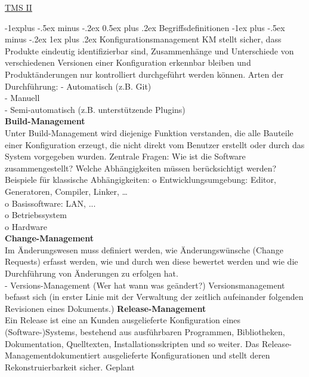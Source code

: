 \documentclass[5pt]{article}
\makeatletter
\renewcommand{\subsection}{\@startsection{subsection}{2}{0mm}%
                                {-1explus -.5ex minus -.2ex}%
                                {0.5ex plus .2ex}%
                                {\normalfont\normalsize\bfseries}}
\renewcommand{\subsubsection}{\@startsection{subsubsection}{3}{0mm}%
                                {-1ex plus -.5ex minus -.2ex}%
                                {1ex plus .2ex}%
                                {\normalfont\small\bfseries}}
\makeatother
\begin{document}
\raggedcolumns
\raggedright
\footnotesize
\begin{multicols*}{2}


\setlength{\premulticols}{1pt}
\setlength{\postmulticols}{1pt}
\setlength{\multicolsep}{1pt}
\setlength{\columnsep}{2pt}

\begin{center}
     \Large{\underline{TMS II}} \\
 
\end{center}


\subsection{Begriffsdefinitionen}
\subsubsection{Konfigurationsmanagement}
KM stellt sicher, dass Produkte eindeutig identifizierbar sind, Zusammenhänge und Unterschiede von
verschiedenen Versionen einer Konfiguration erkennbar bleiben und Produktänderungen nur kontrolliert durchgeführt werden können.
Arten der Durchführung:
- Automatisch (z.B. Git)\\
- Manuell\\
- Semi-automatisch (z.B. unterstützende Plugins)\\
\textbf{Build-Management}\\
Unter Build-Management wird diejenige Funktion verstanden, die alle Bauteile einer Konfiguration
erzeugt, die nicht direkt vom Benutzer erstellt oder durch das System vorgegeben wurden. Zentrale Fragen: Wie ist die Software zusammengestellt? Welche Abhängigkeiten müssen berücksichtigt werden? Beispiele für klassische Abhängigkeiten:
o Entwicklungsumgebung: Editor, Generatoren, Compiler, Linker, …\\
o Basissoftware: LAN, ...\\
o Betriebssystem\\
o Hardware\\
\textbf{Change-Management}\\
Im Änderungswesen muss definiert werden, wie Änderungswünsche (Change Requests) erfasst
werden, wie und durch wen diese bewertet werden und wie die Durchführung von Änderungen
zu erfolgen hat.\\
- Versions-Management (Wer hat wann was geändert?)
Versionsmanagement befasst sich (in erster Linie mit der Verwaltung der zeitlich aufeinander folgenden Revisionen eines Dokuments.)
\textbf{Release-Management}\\
Ein Release ist eine an Kunden ausgelieferte Konfiguration eines (Software-)Systems, bestehend
aus ausführbaren Programmen, Bibliotheken, Dokumentation, Quelltexten, Installationsskripten
und so weiter. Das Release-Managementdokumentiert ausgelieferte Konfigurationen und stellt
deren Rekonstruierbarkeit sicher.
Geplant

\end{multicols*}
\end{document}
